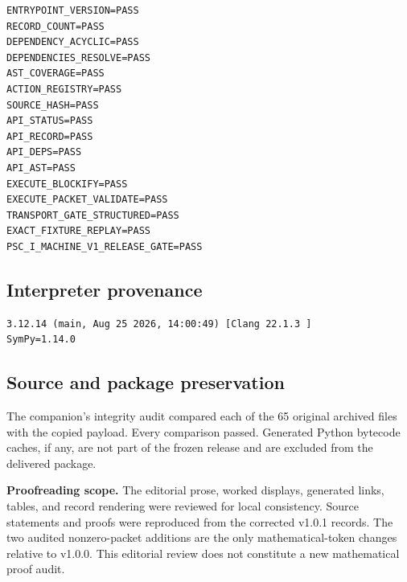 \documentclass[a4paper,11pt]{article}
\begin{document}
\begin{lstlisting}
ENTRYPOINT_VERSION=PASS
RECORD_COUNT=PASS
DEPENDENCY_ACYCLIC=PASS
DEPENDENCIES_RESOLVE=PASS
AST_COVERAGE=PASS
ACTION_REGISTRY=PASS
SOURCE_HASH=PASS
API_STATUS=PASS
API_RECORD=PASS
API_DEPS=PASS
API_AST=PASS
EXECUTE_BLOCKIFY=PASS
EXECUTE_PACKET_VALIDATE=PASS
TRANSPORT_GATE_STRUCTURED=PASS
EXACT_FIXTURE_REPLAY=PASS
PSC_I_MACHINE_V1_RELEASE_GATE=PASS

\end{lstlisting}
\subsection*{Interpreter provenance}

\begin{lstlisting}
3.12.14 (main, Aug 25 2026, 14:00:49) [Clang 22.1.3 ]
SymPy=1.14.0

\end{lstlisting}
\subsection*{Source and package preservation}
The companion's integrity audit compared each of the 65 original archived files with the copied payload. Every comparison passed. Generated Python bytecode caches, if any, are not part of the frozen release and are excluded from the delivered package.

\textbf{Proofreading scope.} The editorial prose, worked displays, generated links, tables, and record rendering were reviewed for local consistency. Source statements and proofs were reproduced from the corrected v1.0.1 records. The two audited nonzero-packet additions are the only mathematical-token changes relative to v1.0.0. This editorial review does not constitute a new mathematical proof audit.
\end{document}
